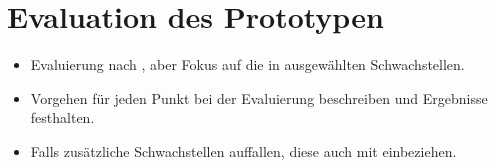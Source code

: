 \section{Evaluation des Prototypen}
\label{sec:evaluation}

    \begin{itemize}
        \item Evaluierung nach \cite{Miessler}, aber Fokus auf die in  ausgewählten Schwachstellen. 
        \item Vorgehen für jeden Punkt bei der Evaluierung beschreiben und Ergebnisse festhalten. 
        \item Falls zusätzliche Schwachstellen auffallen, diese auch mit einbeziehen.
    \end{itemize}